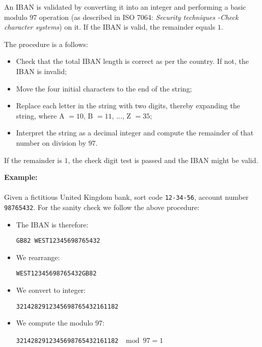 	An IBAN is validated by converting it into an integer and performing a basic modulo $97$ operation (as described in ISO 7064: \textit{Security techniques -Check character systems}) on it. If the IBAN is valid, the remainder equals $1$.

	The procedure is a follows:
	\begin{itemize}
		\item Check that the total IBAN length is correct as per the country. If not, the IBAN is invalid;

		\item Move the four initial characters to the end of the string;

		\item Replace each letter in the string with two digits, thereby expanding the string, where A $= 10$, B $= 11$, ..., Z $= 35$;
	
		\item Interpret the string as a decimal integer and compute the remainder of that number on division by $97$.
	\end{itemize}
	If the remainder is $1$, the check digit test is passed and the IBAN might be valid.
	\begin{tcolorbox}[colframe=black,colback=white,sharp corners]
	\textbf{{\Large {}}Example:}\\\\
	Given a fictitious United Kingdom bank, sort code \texttt{12-34-56}, account number \texttt{98765432}. For the sanity check we follow the above procedure:
	\begin{itemize}
		\item The IBAN is therefore:
		\begin{center}
			\texttt{GB82 WEST12345698765432}
		\end{center}

		\item We rearrange:
		\begin{center}
			\texttt{WEST12345698765432GB82}
		\end{center}

		\item We convert to integer:
		\begin{center}
			\texttt{3214282912345698765432161182}
		\end{center}

		\item We compute the modulo $97$:
		\begin{center}
			\texttt{3214282912345698765432161182} $\mod 97=1$
		\end{center}
	\end{itemize}
	\end{tcolorbox}
	
